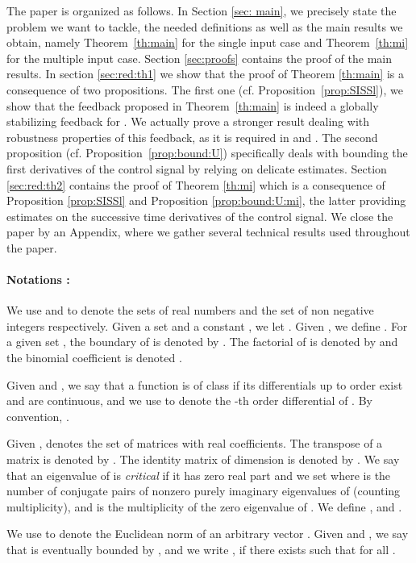 \documentclass[letterpaper, 10pt]{article}
\begin{document}
The paper is organized as follows. In Section \ref{sec: main}, we precisely state the problem we want to tackle, the needed definitions as well as the main results we obtain, namely Theorem~\ref{th:main} for the single input case and Theorem~\ref{th:mi} for the multiple input case. Section \ref{sec:proofs} contains the proof of the main results. In section \ref{sec:red:th1} we show that the proof of Theorem \ref{th:main} is a consequence of two propositions. The first one (cf. Proposition~\ref{prop:SISSl}), we show that the feedback proposed in Theorem~\ref{th:main} is indeed a globally stabilizing feedback for . We actually prove a stronger result dealing with robustness properties of this feedback, as it is required in \cite{Teel92} and \cite{SSY}. The second proposition (cf. Proposition~\ref{prop:bound:U}) specifically deals with bounding the  first derivatives of the control signal by relying on delicate estimates. Section \ref{sec:red:th2} contains the proof of Theorem \ref{th:mi} which is a consequence of Proposition \ref{prop:SISSl} and Proposition \ref{prop:bound:U:mi}, the latter providing estimates on the successive time derivatives of the control signal. We close the paper by an Appendix, where we gather several technical results used throughout the paper.



\paragraph{Notations :} We use  and  to denote the sets of real numbers and the set of non negative integers respectively. Given a set  and a constant , we let . Given , we define . For a given set ,  the boundary of  is denoted by . The factorial of  is denoted by  and the binomial coefficient is denoted  .

Given  and , we say that a function  is of class  if its differentials up to order  exist and are continuous, and we use  to denote the -th order differential of . By convention, . 

Given ,  denotes the set of  matrices with real coefficients. The transpose of a matrix  is denoted by . The identity matrix of dimension  is denoted by . We say that an eigenvalue of  is {\it critical} if it has zero real part and we set  where  is the number of conjugate pairs of nonzero purely imaginary eigenvalues of  (counting multiplicity), and  is the multiplicity of the zero eigenvalue of . We define , and . 

We use  to denote the Euclidean  norm of an arbitrary vector . Given  and , we say that  is eventually bounded by , and we write , if there exists  such that  for all .
\end{document}
